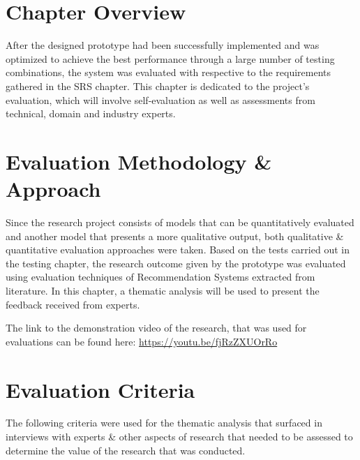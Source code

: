
\section{Chapter Overview}
After the designed prototype had been successfully implemented and was optimized to achieve the best performance through a large number of testing combinations, the system was evaluated with respective to the requirements gathered in the SRS chapter. This chapter is dedicated to the project's evaluation, which will involve self-evaluation as well as assessments from technical, domain and industry experts.

\section{Evaluation Methodology \& Approach}
Since the research project consists of models that can be quantitatively evaluated and another model that presents a more qualitative output, both qualitative \& quantitative evaluation approaches were taken. Based on the tests carried out in the testing chapter, the research outcome given by the prototype was evaluated using evaluation techniques of Recommendation Systems extracted from literature. In this chapter, a thematic analysis will be used to present the feedback received from experts.

\noindent The link to the demonstration video of the research, that was used for evaluations can be found here: \url{https://youtu.be/fjRzZXUOrRo}

\section{Evaluation Criteria}

The following criteria were used for the thematic analysis that surfaced in interviews with experts \& other aspects of research that needed to be assessed to determine the value of the research that was conducted.

